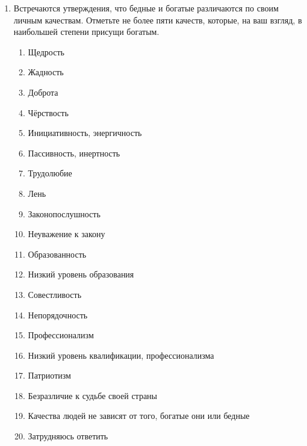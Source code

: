 \begin{enumerate}
    \item Встречаются утверждения, что бедные и богатые различаются по своим 
        личным качествам. Отметьте не более пяти качеств, которые, на ваш 
        взгляд, в наибольшей степени присущи богатым.
    \begin{enumerate}
        \item[\dline] Щедрость
        \item[\dline] Жадность
        \item[\dline] Доброта
        \item[\dline] Чёрствость
        \item[\dline] Инициативность, энергичность
        \item[\dline] Пассивность, инертность
        \item[\dline] Трудолюбие
        \item[\dline] Лень
        \item[\dline] Законопослушность
        \item[\dline] Неуважение к закону
        \item[\dline] Образованность
        \item[\dline] Низкий уровень образования
        \item[\dline] Совестливость
        \item[\dline] Непорядочность
        \item[\dline] Профессионализм
        \item[\dline] Низкий уровень квалификации, профессионализма
        \item[\dline] Патриотизм
        \item[\dline] Безразличие к судьбе своей страны
        \item[\dline] Качества людей не зависят от того, богатые они или 
            бедные
        \item[\dline] Затрудняюсь ответить
    \end{enumerate}


\end{enumerate}
